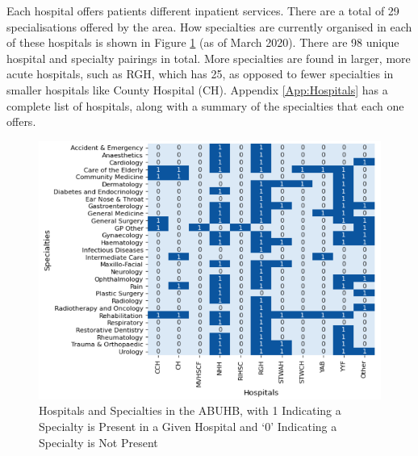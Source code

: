 \documentclass[../thesis.tex]{subfiles}
\begin{document}
Each hospital offers patients different inpatient services. There are a total of 29 specialisations offered by the area. How specialties are currently organised in each of these hospitals is shown in Figure \ref{fig:hospspec} (as of March 2020). There are 98 unique hospital and specialty pairings in total. More specialties are found in larger, more acute hospitals, such as RGH, which has 25, as opposed to fewer specialties in smaller hospitals like County Hospital (CH). Appendix \ref{App:Hospitals} has a complete list of hospitals, along with a summary of the specialties that each one offers.

\begin{figure}[h!]
    \centering
    \includegraphics[scale=0.9]{Chapters/Chapter1/Figures/Hospitalloc19.png}
    \caption{Hospitals and Specialties in the ABUHB, with 1 Indicating a Specialty is Present in a Given Hospital and `0' Indicating a Specialty is Not Present}
    \label{fig:hospspec}
\end{figure}


\end{document}
